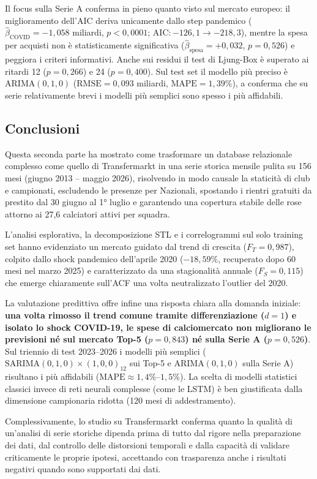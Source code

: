 Il focus sulla Serie A conferma in pieno quanto visto sul mercato europeo: il miglioramento dell'AIC deriva unicamente dallo step pandemico ($\hat{\beta}_{\mathrm{COVID}} = -1,058$ miliardi, $p < 0,0001$; $\mathrm{AIC}: -126,1 \rightarrow -218,3$), mentre la spesa per acquisti non è statisticamente significativa ($\hat{\beta}_{\mathrm{spesa}} = +0,032$, $p = 0,526$) e peggiora i criteri informativi. Anche sui residui il test di Ljung-Box è superato ai ritardi 12 ($p = 0,266$) e 24 ($p = 0,400$). Sul test set il modello più preciso è $\mathrm{ARIMA}(0, 1, 0)$ ($\mathrm{RMSE} = 0,093$ miliardi, $\mathrm{MAPE} = 1,39\%$), a conferma che su serie relativamente brevi i modelli più semplici sono spesso i più affidabili.

\subsection{Conclusioni}

Questa seconda parte ha mostrato come trasformare un database relazionale complesso come quello di Transfermarkt in una serie storica mensile pulita su 156 mesi (giugno 2013 -- maggio 2026), risolvendo in modo causale la staticità di club e campionati, escludendo le presenze per Nazionali, spostando i rientri gratuiti da prestito dal 30 giugno al 1° luglio e garantendo una copertura stabile delle rose attorno ai 27,6 calciatori attivi per squadra.

L'analisi esplorativa, la decomposizione STL e i correlogrammi sul solo training set hanno evidenziato un mercato guidato dal trend di crescita ($F_T = 0,987$), colpito dallo shock pandemico dell'aprile 2020 ($-18,59\%$, recuperato dopo 60 mesi nel marzo 2025) e caratterizzato da una stagionalità annuale ($F_S = 0,115$) che emerge chiaramente sull'ACF una volta neutralizzato l'outlier del 2020.

La valutazione predittiva offre infine una risposta chiara alla domanda iniziale: \textbf{una volta rimosso il trend comune tramite differenziazione ($d = 1$) e isolato lo shock COVID-19, le spese di calciomercato non migliorano le previsioni né sul mercato Top-5 ($p = 0,843$) né sulla Serie A ($p = 0,526$)}. Sul triennio di test 2023--2026 i modelli più semplici ($\mathrm{SARIMA}(0, 1, 0) \times (1, 0, 0)_{12}$ sui Top-5 e $\mathrm{ARIMA}(0, 1, 0)$ sulla Serie A) risultano i più affidabili ($\mathrm{MAPE} \approx 1,4\%\text{--}1,5\%$). La scelta di modelli statistici classici invece di reti neurali complesse (come le LSTM) è ben giustificata dalla dimensione campionaria ridotta (120 mesi di addestramento).

Complessivamente, lo studio su Transfermarkt conferma quanto la qualità di un'analisi di serie storiche dipenda prima di tutto dal rigore nella preparazione dei dati, dal controllo delle distorsioni temporali e dalla capacità di validare criticamente le proprie ipotesi, accettando con trasparenza anche i risultati negativi quando sono supportati dai dati.
